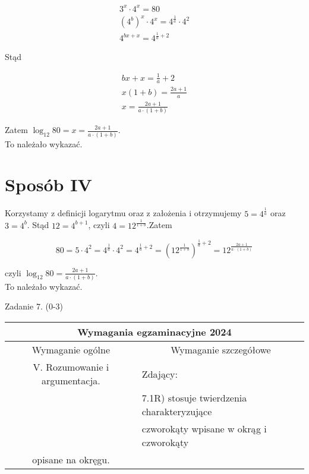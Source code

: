 \documentclass[10pt]{article}
\begin{document}
$$
\begin{gathered}
3^{x} \cdot 4^{x}=80 \\
\left(4^{b}\right)^{x} \cdot 4^{x}=4^{\frac{1}{a}} \cdot 4^{2} \\
4^{b x+x}=4^{\frac{1}{a}+2}
\end{gathered}
$$

Stąd

$$
\begin{gathered}
b x+x=\frac{1}{a}+2 \\
x(1+b)=\frac{2 a+1}{a} \\
x=\frac{2 a+1}{a \cdot(1+b)}
\end{gathered}
$$

Zatem $\log _{12} 80=x=\frac{2 a+1}{a \cdot(1+b)}$.\\
To należało wykazać.

\section*{Sposób IV}
Korzystamy z definicji logarytmu oraz z założenia i otrzymujemy $5=4^{\frac{1}{a}}$ oraz $3=4^{b}$. Stąd $12=4^{b+1}$, czyli $4=12^{\frac{1}{1+b}}$.Zatem

$$
80=5 \cdot 4^{2}=4^{\frac{1}{a}} \cdot 4^{2}=4^{\frac{1}{a}+2}=\left(12^{\frac{1}{1+b}}\right)^{\frac{1}{a}+2}=12^{\frac{2 a+1}{a \cdot(1+b)}}
$$

czyli $\log _{12} 80=\frac{2 a+1}{a \cdot(1+b)}$.\\
To należało wykazać.

Zadanie 7. (0-3)

\begin{center}
\begin{tabular}{|c|l|}
\hline
\multicolumn{2}{|c|}{Wymagania egzaminacyjne 2024} \\
\hline
\multicolumn{1}{|c|}{Wymaganie ogólne} & \multicolumn{1}{c|}{Wymaganie szczegółowe} \\
\hline
V. Rozumowanie i argumentacja. & Zdający: \\
 & 7.1R) stosuje twierdzenia charakteryzujące \\
 & czworokąty wpisane w okrąg i czworokąty \\
opisane na okręgu. &  \\
\hline
\end{tabular}
\end{center}
\end{document}
